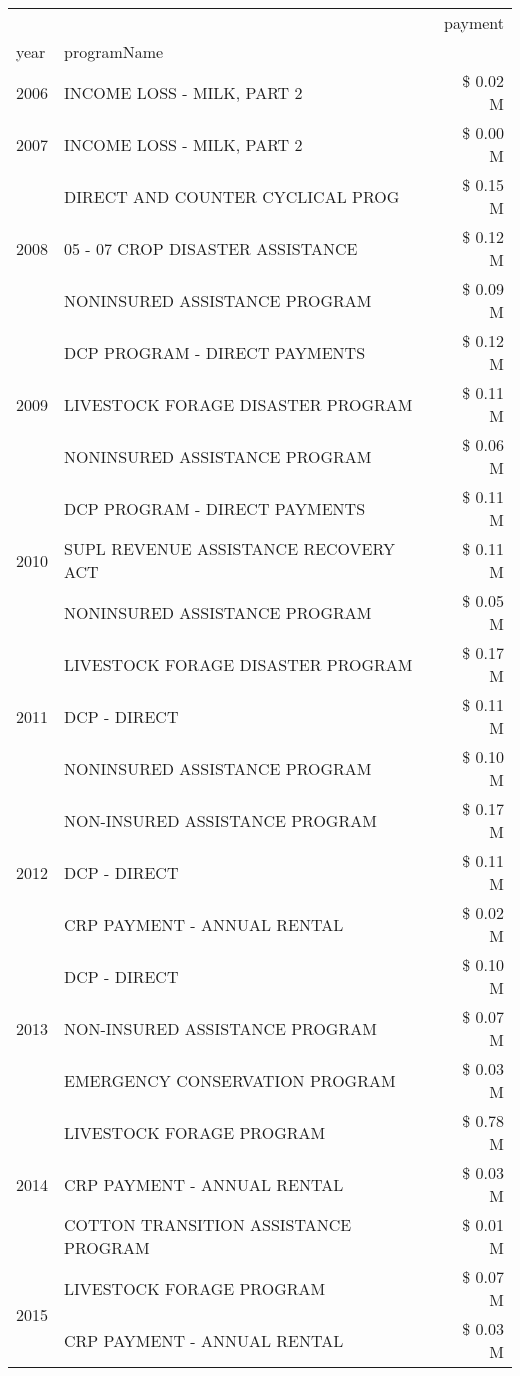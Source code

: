 \begin{tabular}{llr}
\toprule
 &  & payment \\
year & programName &  \\
\midrule
2006 & INCOME LOSS - MILK, PART 2 & \$ 0.02 M \\
\cline{1-3}
2007 & INCOME LOSS - MILK, PART 2 & \$ 0.00 M \\
\cline{1-3}
\multirow[t]{3}{*}{2008} & DIRECT AND COUNTER CYCLICAL PROG & \$ 0.15 M \\
 & 05 - 07 CROP DISASTER ASSISTANCE & \$ 0.12 M \\
 & NONINSURED ASSISTANCE PROGRAM & \$ 0.09 M \\
\cline{1-3}
\multirow[t]{3}{*}{2009} & DCP PROGRAM - DIRECT PAYMENTS & \$ 0.12 M \\
 & LIVESTOCK FORAGE DISASTER  PROGRAM & \$ 0.11 M \\
 & NONINSURED ASSISTANCE PROGRAM & \$ 0.06 M \\
\cline{1-3}
\multirow[t]{3}{*}{2010} & DCP PROGRAM - DIRECT PAYMENTS & \$ 0.11 M \\
 & SUPL REVENUE ASSISTANCE RECOVERY ACT & \$ 0.11 M \\
 & NONINSURED ASSISTANCE PROGRAM & \$ 0.05 M \\
\cline{1-3}
\multirow[t]{3}{*}{2011} & LIVESTOCK FORAGE DISASTER PROGRAM & \$ 0.17 M \\
 & DCP - DIRECT & \$ 0.11 M \\
 & NONINSURED ASSISTANCE PROGRAM & \$ 0.10 M \\
\cline{1-3}
\multirow[t]{3}{*}{2012} & NON-INSURED ASSISTANCE PROGRAM & \$ 0.17 M \\
 & DCP - DIRECT & \$ 0.11 M \\
 & CRP PAYMENT - ANNUAL RENTAL & \$ 0.02 M \\
\cline{1-3}
\multirow[t]{3}{*}{2013} & DCP - DIRECT & \$ 0.10 M \\
 & NON-INSURED ASSISTANCE PROGRAM & \$ 0.07 M \\
 & EMERGENCY CONSERVATION PROGRAM & \$ 0.03 M \\
\cline{1-3}
\multirow[t]{3}{*}{2014} & LIVESTOCK FORAGE PROGRAM & \$ 0.78 M \\
 & CRP PAYMENT - ANNUAL RENTAL & \$ 0.03 M \\
 & COTTON TRANSITION ASSISTANCE PROGRAM & \$ 0.01 M \\
\cline{1-3}
\multirow[t]{3}{*}{2015} & LIVESTOCK FORAGE PROGRAM & \$ 0.07 M \\
 & CRP PAYMENT - ANNUAL RENTAL & \$ 0.03 M \\

\end{tabular}
